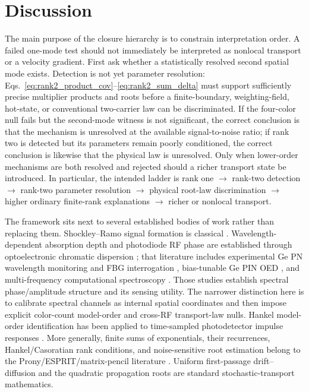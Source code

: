 \documentclass[11pt]{article}
\begin{document}
\section{Discussion}

The main purpose of the closure hierarchy is to constrain interpretation order. A failed one-mode test should not immediately be interpreted as nonlocal transport or a velocity gradient. First ask whether a statistically resolved second spatial mode exists. Detection is not yet parameter resolution: Eqs.~\eqref{eq:rank2_product_cov}--\eqref{eq:rank2_sum_delta} must support sufficiently precise multiplier products and roots before a finite-boundary, weighting-field, hot-state, or conventional two-carrier law can be discriminated. If the four-color null fails but the second-mode witness is not significant, the correct conclusion is that the mechanism is unresolved at the available signal-to-noise ratio; if rank two is detected but its parameters remain poorly conditioned, the correct conclusion is likewise that the physical law is unresolved. Only when lower-order mechanisms are both resolved and rejected should a richer transport state be introduced. In particular, the intended ladder is rank one $\rightarrow$ rank-two detection $\rightarrow$ rank-two parameter resolution $\rightarrow$ physical root-law discrimination $\rightarrow$ higher ordinary finite-rank explanations $\rightarrow$ richer or nonlocal transport.

The framework sits next to several established bodies of work rather than replacing them. Shockley--Ramo signal formation is classical \cite{Shockley1938,Ramo1939,Dabrowski1989}. Wavelength-dependent absorption depth and photodiode RF phase are established through optoelectronic chromatic dispersion \cite{Glasser2021}; that literature includes experimental Ge PN wavelength monitoring and FBG interrogation \cite{Liokumovitch2021}, bias-tunable Ge PIN OED \cite{Dutta2024}, and multi-frequency computational spectroscopy \cite{Kassa2026}. Those studies establish spectral phase/amplitude structure and its sensing utility. The narrower distinction here is to calibrate spectral channels as internal spatial coordinates and then impose explicit color-count model-order and cross-RF transport-law nulls. Hankel model-order identification has been applied to time-sampled photodetector impulse responses \cite{Sun2025}. More generally, finite sums of exponentials, their recurrences, Hankel/Casoratian rank conditions, and noise-sensitive root estimation belong to the Prony/ESPRIT/matrix-pencil literature \cite{Prony1795,RoyKailath1989,HuaSarkar1990}. Uniform first-passage drift--diffusion and the quadratic propagation roots are standard stochastic-transport mathematics.
\end{document}
